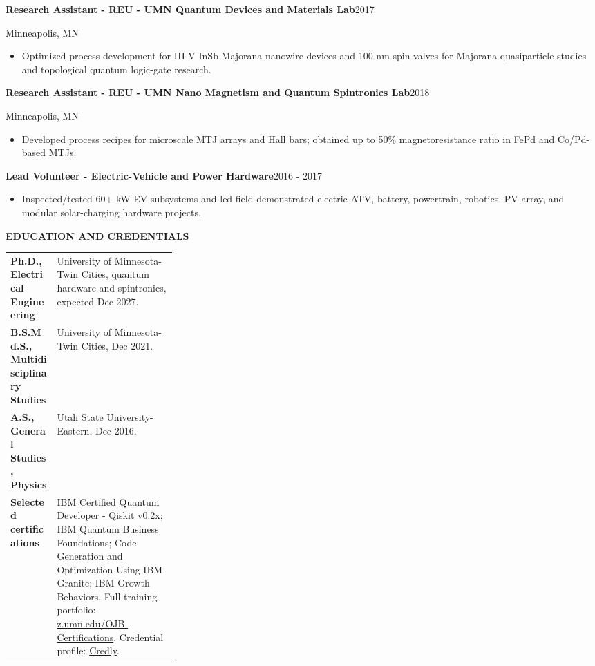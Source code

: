 \documentclass[10pt,letterpaper]{article}
\newcommand{\sectionheading}[1]{%
  \vspace{4pt}%
  {\fontsize{9.5}{10.5}\selectfont\bfseries\color{PureBlue}\MakeUppercase{#1}}\par
  \vspace{-6pt}{\color{PureBlue}\rule{\linewidth}{0.45pt}}\vspace{1pt}
}
\newcommand{\entry}[4]{%
  \textbf{#1}\hfill {\color{PureBlue}#2}\par
  {\fontsize{8.7}{10}\selectfont #3}\par
  \vspace{-2pt}#4\vspace{1pt}
}
\newenvironment{compactitems}{%
  \begin{itemize}[leftmargin=12pt,itemsep=1.0pt,topsep=1pt,parsep=0pt,partopsep=0pt]
}{%
  \end{itemize}
}
\begin{document}
\entry{Research Assistant - REU - UMN Quantum Devices and Materials Lab}{2017}{Minneapolis, MN}{%
\begin{compactitems}
  \item Optimized process development for III-V InSb Majorana nanowire devices and 100 nm spin-valves for Majorana quasiparticle studies and topological quantum logic-gate research.
\end{compactitems}}

\entry{Research Assistant - REU - UMN Nano Magnetism and Quantum Spintronics Lab}{2018}{Minneapolis, MN}{%
\begin{compactitems}
  \item Developed process recipes for microscale MTJ arrays and Hall bars; obtained up to 50\% magnetoresistance ratio in FePd and Co/Pd-based MTJs.
\end{compactitems}}

\entry{Lead Volunteer - Electric-Vehicle and Power Hardware}{2016 - 2017}{}{%
\begin{compactitems}
  \item Inspected/tested 60+ kW EV subsystems and led field-demonstrated electric ATV, battery, powertrain, robotics, PV-array, and modular solar-charging hardware projects.
\end{compactitems}}

\sectionheading{Education and Credentials}
\begin{tabularx}{\linewidth}{@{}p{0.28\linewidth}Y@{}}
\textbf{Ph.D., Electrical Engineering} & University of Minnesota-Twin Cities, quantum hardware and spintronics, expected Dec 2027. \\
\textbf{B.S.Md.S., Multidisciplinary Studies} & University of Minnesota-Twin Cities, Dec 2021. \\
\textbf{A.S., General Studies, Physics} & Utah State University-Eastern, Dec 2016. \\
\textbf{Selected certifications} & IBM Certified Quantum Developer - Qiskit v0.2x; IBM Quantum Business Foundations; Code Generation and Optimization Using IBM Granite; IBM Growth Behaviors. Full training portfolio: \href{https://z.umn.edu/OJB-Certifications}{z.umn.edu/OJB-Certifications}. Credential profile: \href{https://www.credly.com/users/onri-jay-benally}{Credly}. \\
\end{tabularx}
\end{document}
